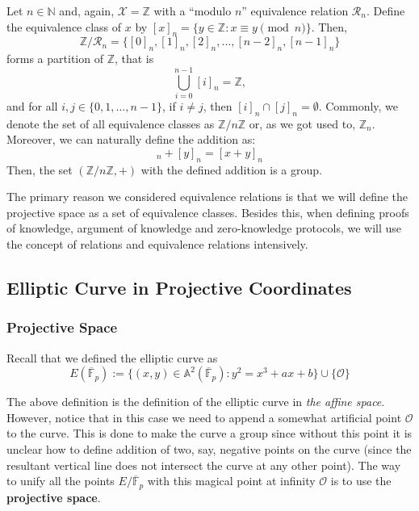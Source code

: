 \documentclass[../lecture-notes.tex]{subfiles}
\begin{document}
\begin{example}
    Let $n \in \mathbb{N}$ and, again, $\mathcal{X} = \mathbb{Z}$ with a ``modulo $n$'' equivalence relation $\mathcal{R}_n$. Define the equivalence class of $x$ by $[x]_n = \{y \in \mathbb{Z}: x \equiv y \pmod{n}\}$. Then, 
    \begin{equation*}
        \mathbb{Z}/\mathcal{R}_n = \{[0]_n, [1]_n, [2]_n, \dots, [n-2]_n, [n-1]_n\}
    \end{equation*}
    forms a partition of $\mathbb{Z}$, that is 
    \begin{equation*}
        \bigcup_{i=0}^{n-1} [i]_n = \mathbb{Z},
    \end{equation*}
    and for all $i,j \in \{0,1,\dots,n-1\}$, if $i \neq j$, then $[i]_n \cap [j]_n = \emptyset$. Commonly, we denote the set of all equivalence classes as $\mathbb{Z}/n\mathbb{Z}$ or, as we got used to, $\mathbb{Z}_n$. Moreover, we can naturally define the addition as:
    \begin{equation*}
        [x]_n + [y]_n = [x+y]_n
    \end{equation*}
    Then, the set $(\mathbb{Z}/n\mathbb{Z},+)$ with the defined addition is a group.
\end{example}

The primary reason we considered equivalence relations is that we will define the projective space as a set of equivalence classes. Besides this, when defining proofs of knowledge, argument of knowledge and zero-knowledge protocols, we will use the concept of relations and equivalence relations intensively.

\subsection{Elliptic Curve in Projective Coordinates}
\subsubsection{Projective Space}

Recall that we defined the elliptic curve as 
\begin{equation*}
    E(\overline{\mathbb{F}}_p) := \{(x,y) \in \mathbb{A}^2(\overline{\mathbb{F}}_p): y^2 = x^3+ax+b\} \cup \{\mathcal{O}\}
\end{equation*}

The above definition is the definition of the elliptic curve in \textit{the affine space}. However, notice that in this case 
we need to append a somewhat artificial point $\mathcal{O}$ to the curve. This is done to make the curve a group since without 
this point it is unclear how to define addition of two, say, negative points on the curve (since the resultant vertical line
does not intersect the curve at any other point). The way to unify all the points $E/\overline{\mathbb{F}}_p$ with this 
magical point at infinity $\mathcal{O}$ is to use the \textbf{projective space}.
\end{document}
